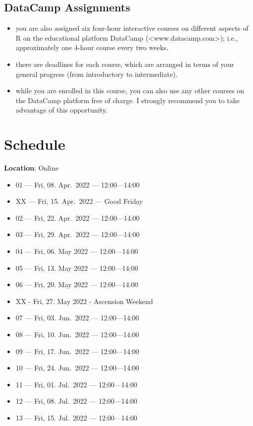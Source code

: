 \documentclass[
]{book}
\providecommand{\tightlist}{%
  \setlength{\itemsep}{0pt}\setlength{\parskip}{0pt}}
\begin{document}
\hypertarget{datacamp-assignments}{%
\subsection{DataCamp Assignments}\label{datacamp-assignments}}

\begin{itemize}
\tightlist
\item
  you are also assigned six four-hour interactive courses on different aspects of R on the educational platform DataCamp (\textless www.datacamp.com\textgreater); i.e., approximately one 4-hour course every two weeks.
\item
  there are deadlines for each course, which are arranged in terms of your general progress (from introductory to intermediate).
\item
  while you are enrolled in this course, you can also use any other courses on the DataCamp platform free of charge. I strongly recommend you to take advantage of this opportunity.
\end{itemize}

\hypertarget{schedule}{%
\section{Schedule}\label{schedule}}

\textbf{Location}: Online

\begin{itemize}
\tightlist
\item
  01 --- Fri, 08. Apr.~2022 --- 12:00---14:00
\item
  XX --- Fri, 15. Apr.~2022 --- Good Friday
\item
  02 --- Fri, 22. Apr.~2022 --- 12:00---14:00
\item
  03 --- Fri, 29. Apr.~2022 --- 12:00---14:00
\item
  04 --- Fri, 06. May 2022 --- 12:00---14:00
\item
  05 --- Fri, 13. May 2022 --- 12:00---14:00
\item
  06 --- Fri, 20. May 2022 --- 12:00---14:00
\item
  XX - Fri, 27. May 2022 - Ascension Weekend
\item
  07 --- Fri, 03. Jun.~2022 --- 12:00---14:00
\item
  08 --- Fri, 10. Jun.~2022 --- 12:00---14:00
\item
  09 --- Fri, 17. Jun.~2022 --- 12:00---14:00
\item
  10 --- Fri, 24. Jun.~2022 --- 12:00---14:00
\item
  11 --- Fri, 01. Jul.~2022 --- 12:00---14:00
\item
  12 --- Fri, 08. Jul.~2022 --- 12:00---14:00
\item
  13 --- Fri, 15. Jul.~2022 --- 12:00---14:00
\end{itemize}
\end{document}
